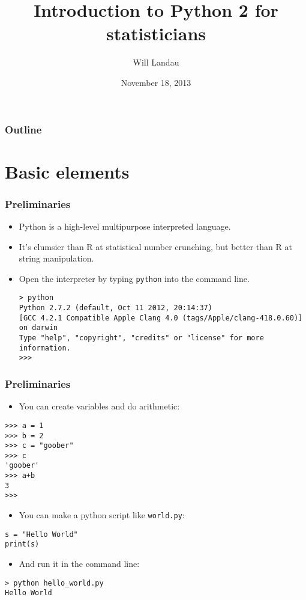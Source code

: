 \documentclass[handout]{beamer}
\title{Introduction to Python 2 for statisticians}
\author{Will Landau}
\date{November 18, 2013}
\institute{Iowa State University}
\numberwithin{equation}{section}
\begin{document}
\begin{frame}
\titlepage
 \end{frame}
 
 \begin{frame}
\frametitle{Outline}
\tableofcontents
\end{frame}
 

\section{Basic elements}

\begin{frame}[fragile]
\frametitle{Preliminaries}
\begin{itemize}
\item Python is a high-level multipurpose interpreted language. 
\pause \item It's clumsier than R at statistical number crunching, but better than R at string manipulation.
\pause \item Open the interpreter by typing {\tt python} into the command line.
\begin{lstlisting}[name=ex]
> python
Python 2.7.2 (default, Oct 11 2012, 20:14:37) 
[GCC 4.2.1 Compatible Apple Clang 4.0 (tags/Apple/clang-418.0.60)] on darwin
Type "help", "copyright", "credits" or "license" for more information.
>>> 
\end{lstlisting}
\end{itemize}
\end{frame}

\begin{frame}[fragile]
\frametitle{Preliminaries}
\begin{itemize}
\item You can create variables and do arithmetic:
\end{itemize}
\begin{lstlisting}[name=ex]
>>> a = 1
>>> b = 2
>>> c = "goober"
>>> c
'goober'
>>> a+b
3
>>> 
\end{lstlisting}
\begin{itemize}
\pause \item You can make a python script like {\tt world.py}:
\end{itemize}
\begin{lstlisting}[name=ex]
s = "Hello World"
print(s)
\end{lstlisting}
\begin{itemize}
\pause \item And run it in the command line:
\end{itemize}
\begin{lstlisting}[name=ex]
> python hello_world.py
Hello World
\end{lstlisting}
\end{frame}
\end{document}
